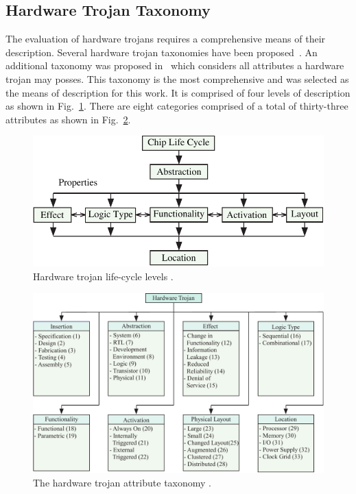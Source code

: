 \documentclass[journal, hidelinks]{IEEEtran}
\begin{document}
\subsection{Hardware Trojan Taxonomy} \label{sec:taxonomy}
The evaluation of hardware trojans requires a comprehensive means of their description.
Several hardware trojan taxonomies have been proposed~\cite{taxonomy1, taxonomy2, taxonomy3, taxonomy4}.
An additional taxonomy was proposed in~\cite{samerAttribute} which considers all attributes a hardware trojan may posses.
This taxonomy is the most comprehensive and was selected as the means of description for this work.
It is comprised of four levels of description as shown in Fig.~\ref{fig:trojan_life_cycle}.
There are eight categories comprised of a total of thirty-three attributes as shown in Fig.~\ref{fig:HW_trojan}.



\begin{figure}[h]
	\centering
	\includegraphics[width=1\linewidth]{Figures/trojan_life_cyclePDF}
	\caption{Hardware trojan life-cycle levels \cite{samerAttribute}.}
	\label{fig:trojan_life_cycle}
\end{figure}
\begin{figure}
	\centering
	\includegraphics[width=0.775\linewidth]{Figures/HW_trojan}
	\caption{The hardware trojan attribute taxonomy \cite{samerAttribute}.}
	\label{fig:HW_trojan}
\end{figure}
\end{document}
